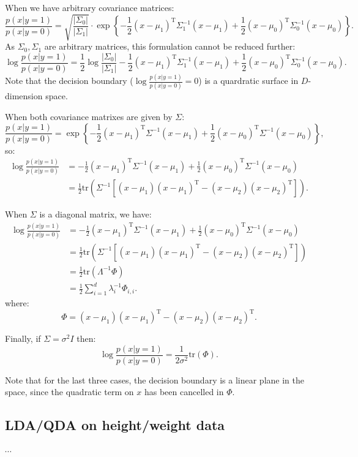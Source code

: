 \documentclass[UTF8]{ctexart}
\begin{document}
When we have arbitrary covariance matrices:
$$\frac{p(x|y=1)}{p(x|y=0)} = \sqrt{\frac{|\Sigma_{0}|}{|\Sigma_{1}|}}\cdot\exp\left\{ -\frac{1}{2}(x-\mu_{1})^{\text{T}}\Sigma_{1}^{-1}(x-\mu_{1}) + \frac{1}{2}(x-\mu_{0})^{\text{T}}\Sigma_{0}^{-1}(x-\mu_{0}) \right\}.$$
As $\Sigma_{0},\Sigma_{1}$ are arbitrary matrices, this formulation cannot be reduced further:
$$\log \frac{p(x|y=1)}{p(x|y=0)}=\frac{1}{2}\log \frac{|\Sigma_{0}|}{|\Sigma_{1}|}-\frac{1}{2}(x-\mu_{1})^{\text{T}}\Sigma_{1}^{-1}(x-\mu_{1})+\frac{1}{2}(x-\mu_{0})^{\text{T}}\Sigma_{0}^{-1}(x-\mu_{0}).$$
Note that the decision boundary ($\log \frac{p(x|y=1)}{p(x|y=0)}=0$) is a quardratic surface in $D$-dimension space.

When both covariance matrixes are given by $\Sigma$:
$$
\frac{p(x|y=1)}{p(x|y=0)} = \exp\left\{ -\frac{1}{2}(x-\mu_{1})^{\text{T}}\Sigma^{-1}(x-\mu_{1}) + \frac{1}{2}(x-\mu_{0})^{\text{T}}\Sigma^{-1}(x-\mu_{0}) \right\},
$$
so:
$$
\begin{aligned}
\log \frac{p(x|y=1)}{p(x|y=0)}&=-\frac{1}{2}(x-\mu_{1})^{\text{T}}\Sigma^{-1}(x-\mu_{1}) + \frac{1}{2}(x-\mu_{0})^{\text{T}}\Sigma^{-1}(x-\mu_{0})\\
&=\frac{1}{2}\text{tr}\left(\Sigma^{-1}\left[(x-\mu_{1})(x-\mu_{1})^{\text{T}}-(x-\mu_{2})(x-\mu_{2})^{\text{T}} \right] \right).
\end{aligned}
$$

When $\Sigma$ is a diagonal matrix, we have:
$$
\begin{aligned}
\log \frac{p(x|y=1)}{p(x|y=0)}&=-\frac{1}{2}(x-\mu_{1})^{\text{T}}\Sigma^{-1}(x-\mu_{1}) + \frac{1}{2}(x-\mu_{0})^{\text{T}}\Sigma^{-1}(x-\mu_{0})\\
&=\frac{1}{2}\text{tr}\left(\Sigma^{-1}\left[(x-\mu_{1})(x-\mu_{1})^{\text{T}}-(x-\mu_{2})(x-\mu_{2})^{\text{T}} \right] \right)\\
&=\frac{1}{2}\text{tr}\left(\Lambda^{-1} \Phi \right)\\
&=\frac{1}{2}\sum_{i=1}^{d}\lambda_{i}^{-1}\Phi_{i,i}.
\end{aligned}
$$
where:
$$\Phi=(x-\mu_{1})(x-\mu_{1})^{\text{T}}-(x-\mu_{2})(x-\mu_{2})^{\text{T}}.$$

Finally, if $\Sigma=\sigma^{2}I$ then:
$$
\log \frac{p(x|y=1)}{p(x|y=0)}=\frac{1}{2\sigma^{2}}\text{tr}(\Phi).
$$

Note that for the last three cases, the decision boundary is a linear plane in the space, since the quadratic term on $x$ has been cancelled in $\Phi$.

\subsection{LDA/QDA on height/weight data}
$\cdots$
\end{document}
